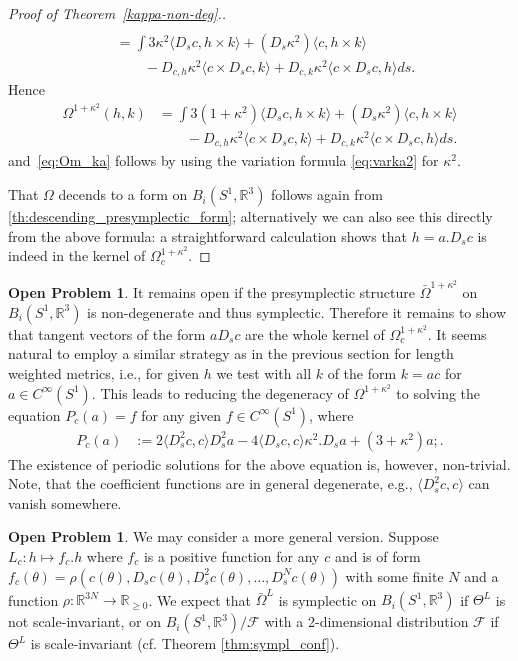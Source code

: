 \documentclass[12pt]{amsart}
\theoremstyle{definition}
\newtheorem{question}[theorem]{Open Problem}
\newcommand{\R}{\mathbb R}
\def\th{\theta}
\def\ka{\kappa}
\def\Th{\Theta}
\def\Om{\Omega}
\def\x{\times}
\def\R{{\mathbb R}}
\begin{document}
\begin{proof}[Proof of Theorem~\ref{kappa-non-deg}.]
\begin{equation}
\begin{aligned}
      \\& =\int 3\kappa^2 \langle D_s c, h \x k\rangle + (D_s \ka^2) \langle c,h \x k\rangle
      \\& \qquad- D_{c,h} \ka^2 \langle c\x D_s c, k \rangle  + D_{c,k} \ka^2 \langle c\x D_s c,h\rangle ds.
\end{aligned}
\end{equation}
Hence 
\begin{align}
     \Om^{1+\ka^2}(h,k) 
     & =\int 3(1+\kappa^2) \langle D_s c, h \x k\rangle +(D_s \ka^2) \langle c,h \x k\rangle
      \\& \qquad - D_{c,h} \ka^2 \langle c\x D_s c, k \rangle  + D_{c,k} \ka^2 \langle c\x D_s c,h\rangle ds.
\end{align}
and~\eqref{eq:Om_ka} follows by using the variation formula \eqref{eq:varka2} for $\ka^2$.







That $\Omega$ decends to a form on $B_i(S^1,\mathbb R^3)$ follows again from \autoref{th:descending_presymplectic_form}; alternatively we can also see this directly from the above formula: a straightforward calculation shows that $h=a.D_sc$ is indeed in the kernel of $\Omega_c^{1+\kappa^2}$.
\end{proof}


\begin{question}
It remains open if the presymplectic structure $\bar\Om^{1+\ka^2}$ on $B_i(S^1,\mathbb R^3)$ is non-de\-ge\-nerate and thus symplectic.   Therefore it remains to show that tangent vectors of the form $aD_sc$ are the whole kernel of $\Omega_c^{1+\kappa^2}$. It seems natural to employ a similar strategy as in the previous section for length weighted metrics, i.e., for given $h$ we test with all $k$ of the form $k=ac$ for $a\in C^{\infty}(S^1)$. This leads to reducing the degeneracy of $\Omega^{1+\kappa^2}$ to solving the equation $P_c(a)=f$ for any given $f\in C^{\infty}(S^1)$, where
\begin{align}
P_c(a) &:= 2 \langle  D_s^2c,c\rangle D_s^2a - 4 \langle D_s c, c \rangle \kappa^2. D_s a  + (3+\kappa^2)a;.
\end{align}
The existence of periodic solutions for the above equation is, however, non-trivial. Note, that the coefficient functions are in general degenerate, e.g.,  $\langle  D_s^2c,c\rangle$ can vanish somewhere. 
\end{question}

\begin{question}
    We may consider a more general version. Suppose $L_c\colon h\mapsto f_c. h$ where $f_c$ is a positive function for any $c$ and is of form $f_c(\theta)=\rho(c(\th),D_s c(\th), D_s^2 c(\th),\ldots, D_s^N c(\th))$ with some finite $N$ and a function $\rho\colon \R^{3N}\to \R_{\geq 0}$. We expect that $\bar \Om^L$ is symplectic on $B_i(S^1,\R^3)$ if $\Th^L$ is not scale-invariant, or on $B_i(S^1,\R^3)/\mathcal{F}$ with a 2-dimensional distribution $\mathcal{F}$ if $\Th^L$ is scale-invariant (cf. Theorem \ref{thm:sympl_conf}).
\end{question}
\end{document}
